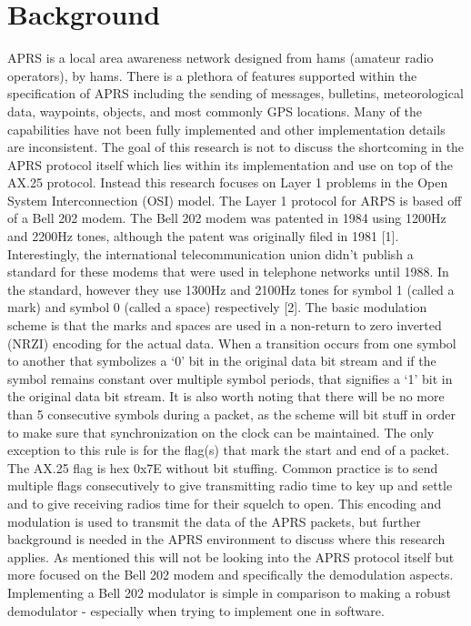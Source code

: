 \chapter{Background}

APRS is a local area awareness network designed from hams (amateur radio operators), by hams. There is a plethora of features supported within the specification of APRS including the sending of messages, bulletins, meteorological data, waypoints, objects, and most commonly GPS locations. Many of the capabilities have not been fully implemented and other implementation details are inconsistent. The goal of this research is not to discuss the shortcoming in the APRS protocol itself which lies within its implementation and use on top of the AX.25 protocol. Instead this research focuses on Layer 1 problems in the Open System Interconnection (OSI) model. 
The Layer 1 protocol for ARPS is based off of a Bell 202 modem. The Bell 202 modem was patented in 1984 using 1200Hz and 2200Hz tones, although the patent was originally filed in 1981 [1]. Interestingly, the international telecommunication union didn’t publish a standard for these modems that were used in telephone networks until 1988. In the standard, however they use 1300Hz and 2100Hz tones for symbol 1 (called a mark) and symbol 0 (called a space) respectively [2]. The basic modulation scheme is that the marks and spaces are used in a non-return to zero inverted (NRZI) encoding for the actual data. When a transition occurs from one symbol to another that symbolizes a ‘0’ bit in the original data bit stream and if the symbol remains constant over multiple symbol periods, that signifies a ‘1’ bit in the original data bit stream. It is also worth noting that there will be no more than 5 consecutive symbols during a packet, as the scheme will bit stuff in order to make sure that synchronization on the clock can be maintained. The only exception to this rule is for the flag(s) that mark the start and end of a packet. The AX.25 flag is hex 0x7E without bit stuffing. Common practice is to send multiple flags consecutively to give transmitting radio time to key up and settle and to give receiving radios time for their squelch to open.
This encoding and modulation is used to transmit the data of the APRS packets, but further background is needed in the APRS environment to discuss where this research applies. As mentioned this will not be looking into the APRS protocol itself but more focused on the Bell 202 modem and specifically the demodulation aspects. Implementing a Bell 202 modulator is simple in comparison to making a robust demodulator - especially when trying to implement one in software.


